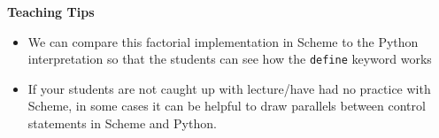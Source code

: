 \begin{blocksection}
\begin{comment}
\begin{lstlisting}
scm> (eq? '() nil)
\end{lstlisting}
\begin{solution}[.25in]
\texttt{\#t}
\end{solution}

\begin{lstlisting}
scm> (pair? (cons 1 2))
\end{lstlisting}
\begin{solution}[.25in]
\texttt{\#t}
\end{solution}

\begin{lstlisting}
scm> (list? (cons 1 2))
\end{lstlisting}
\begin{solution}[.25in]
\texttt{\#f}
\end{solution}
\end{comment}
\end{blocksection}

\begin{blocksection}
\begin{guide}
\textbf{Teaching Tips}
\begin{itemize}
  \item We can compare this factorial implementation in Scheme to the Python interpretation so that the students can see how the \lstinline{define} keyword works
  \item If your students are not caught up with lecture/have had no practice with Scheme, in some cases it can be helpful to draw parallels between control statements in Scheme and Python.
\end{itemize}
\end{guide}
\end{blocksection}
